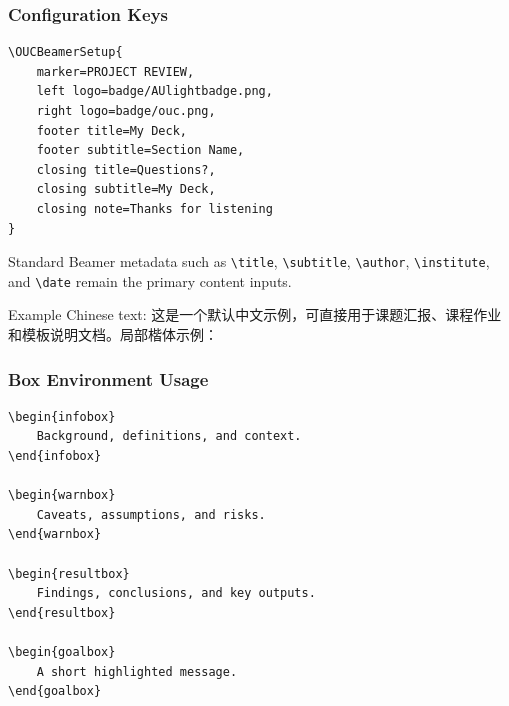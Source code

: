 \documentclass[aspectratio=169,10pt]{beamer}
\begin{document}
\begin{frame}[fragile]
    \frametitle{Configuration Keys}
    \begin{lstlisting}[language={[LaTeX]TeX}]
\OUCBeamerSetup{
    marker=PROJECT REVIEW,
    left logo=badge/AUlightbadge.png,
    right logo=badge/ouc.png,
    footer title=My Deck,
    footer subtitle=Section Name,
    closing title=Questions?,
    closing subtitle=My Deck,
    closing note=Thanks for listening
}
    \end{lstlisting}
    \begin{infobox}
        Standard Beamer metadata such as \texttt{\textbackslash title}, \texttt{\textbackslash subtitle}, \texttt{\textbackslash author}, \texttt{\textbackslash institute}, and \texttt{\textbackslash date} remain the primary content inputs.
    \end{infobox}
    \begin{resultbox}
        Example Chinese text: 这是一个默认中文示例，可直接用于课题汇报、课程作业和模板说明文档。局部楷体示例：
    \end{resultbox}
\end{frame}

\begin{frame}[fragile]
    \frametitle{Box Environment Usage}
    \begin{lstlisting}[language={[LaTeX]TeX}]
\begin{infobox}
    Background, definitions, and context.
\end{infobox}

\begin{warnbox}
    Caveats, assumptions, and risks.
\end{warnbox}

\begin{resultbox}
    Findings, conclusions, and key outputs.
\end{resultbox}

\begin{goalbox}
    A short highlighted message.
\end{goalbox}
    \end{lstlisting}
\end{frame}
\end{document}
